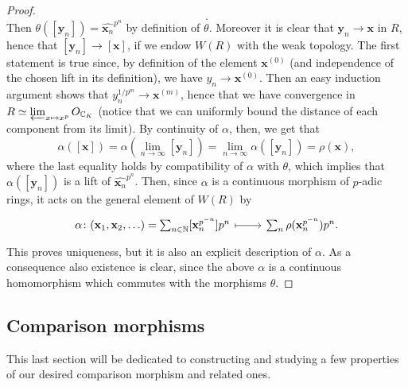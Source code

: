 \begin{proof}
\begin{equation*}
	.\end{equation*}
	Then $\theta([\mathbf{y}_n]) = \widehat{\mathbf{x}_n}^{p^n}$ by definition of $\theta$.
	Moreover it is clear that $\mathbf{y}_n \to \mathbf{x}$ in $R$,
	hence that $[\mathbf{y}_n] \to [\mathbf{x}]$, if we endow $W(R)$ with the weak topology.
	The first statement is true since, by definition of the element $\mathbf{x}^{(0)}$
	(and independence of the chosen lift in its definition), we have
	$y_n \to \mathbf{x}^{(0)}$. Then an easy induction argument
	shows that $y_n^{1/p^m} \to \mathbf{x}^{(m)}$, hence that we have convergence
	in $R \simeq \varprojlim_{x \mapsto x^p}O_{\mathbb{C}_K}$ (notice that we
	can uniformly bound the distance of each component from its limit).
	By continuity of $\alpha$, then, we get that
	\begin{equation*}
		\alpha([\mathbf{x}]) = \alpha\left(\lim_{n \to \infty} [\mathbf{y}_n]\right) =
		\lim_{n \to \infty} \alpha([\mathbf{y}_n]) = \rho(\mathbf{x})
	,\end{equation*}
	where the last equality holds by compatibility of $\alpha$ with $\theta$,
	which implies that $\alpha([\mathbf{y}_n])$ is a lift of $\widehat{\mathbf{x}_n}^{p^n}$.
	Then, since $\alpha$ is a continuous morphism of $p$-adic rings,
	it acts on the general element of $W(R)$ by
	\begin{equation*}
	\begin{tikzcd}[row sep = 0ex
		,/tikz/column 1/.append style={anchor=base east}
		,/tikz/column 2/.append style={anchor=base west}]
		\alpha\colon 
		(\mathbf{x}_1, \mathbf{x}_2, \ldots) =
		\sum_{n \in \mathbb{N} }^{  } [\mathbf{x}_n^{p^{-n}}] p^n
		\arrow[r, "", mapsto] &
		\sum_{n }^{  } \rho (\mathbf{x}_n^{p^{-n}}) p^n
	.\end{tikzcd}
	\end{equation*} 
	This proves uniqueness, but it is also an explicit description of $\alpha$.
	As a consequence also existence is clear, since the above $\alpha$ is
	a continuous homomorphism which commutes with the morphisms $\theta$.
\end{proof}



\subsection{Comparison morphisms}
This last section will be dedicated to constructing and studying a few properties
of our desired comparison morphism and related ones.


